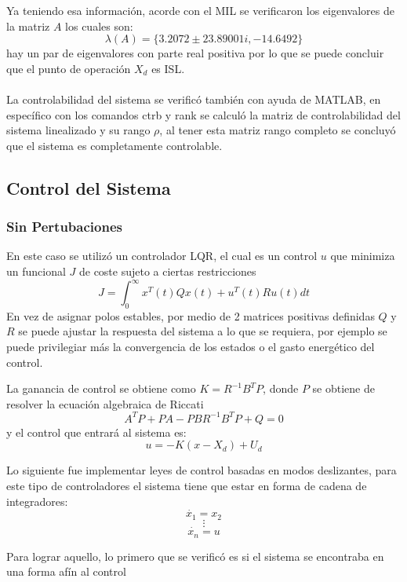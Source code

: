 \documentclass[onecolumn,10pt]{article}
\begin{document}
Ya teniendo esa informaci\'on, acorde con el MIL se verificaron los eigenvalores de la matriz $A$ los cuales son: 
$$\lambda(A)=\lbrace3.2072\pm23.89001i, -14.6492\rbrace$$
hay un par de eigenvalores con parte real positiva por lo que se puede concluir que el punto de operaci\'on $X_{d}$ es ISL.
\\
\\
La controlabilidad del sistema se verific\'o tambi\'en con ayuda de MATLAB, en espec\'ifico con los comandos ctrb y rank se calcul\'o la matriz de controlabilidad del sistema linealizado y su rango $\rho$, al tener esta matriz rango completo se concluy\'o que el sistema es completamente controlable.

\subsection*{Control del Sistema}
\subsubsection*{Sin Pertubaciones}
En este caso se utiliz\'o un controlador LQR, el cual es un control $u$ que minimiza un funcional $J$ de coste sujeto a ciertas restricciones
$$J=\int_{0}^{\infty} x^{T}(t)Qx(t)+u^{T}(t)Ru(t)dt $$
En vez de asignar polos estables, por medio de 2 matrices positivas definidas $Q$ y $R$ se puede ajustar la respuesta del sistema a lo que se requiera, por ejemplo se puede privilegiar m\'as la convergencia de los estados o el gasto energ\'etico del control.

La ganancia de control se obtiene como $K=R^{-1}B^{T}P$, donde $P$ se obtiene de resolver la ecuaci\'on algebraica de Riccati
$$A^{T}P+PA-PBR^{-1}B^{T}P+Q=0$$
y el control que entrar\'a al sistema es:
$$u=-K(x-X_{d})+U_{d}$$

Lo siguiente fue implementar leyes de control basadas en modos deslizantes, para este tipo de controladores el sistema tiene que estar en forma de cadena de integradores:
$$\dot{x_1}= x_2$$
$$\vdots$$
$$\dot{x_n}= u$$

Para lograr aquello, lo primero que se verific\'o es si el sistema se encontraba en una forma af\'in al control 
\end{document}
